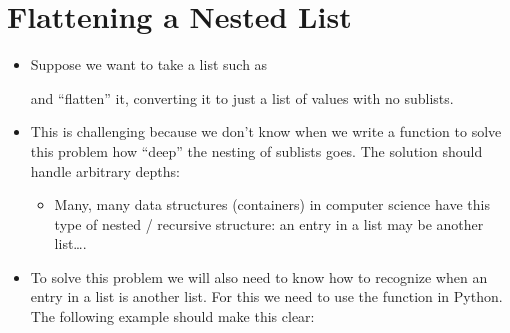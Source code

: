 \documentclass[letterpaper,10pt,english]{sphinxmanual}
\begin{document}
\section{Flattening a Nested List}
\label{\detokenize{lecture_notes/lec23_recursion:flattening-a-nested-list}}\begin{itemize}
\item {} 
Suppose we want to take a list such as

%
\begin{sphinxVerbatim}[commandchars=\\\{\}]
  \PYG{p}{[}\PYG{p}{[}\PYG{p}{]}  \PYG{p}{[}\PYG{p}{[}\PYG{p}{]}\PYG{p}{]} \PYG{p}{[} \PYG{p}{[}  \PYG{p}{[}\PYG{p}{]} \PYG{p}{[}\PYG{p}{]} \PYG{p}{]}\PYG{p}{]}\PYG{p}{]}
\end{sphinxVerbatim}

and “flatten” it, converting it to just a list of values with no sublists.

%
\begin{sphinxVerbatim}[commandchars=\\\{\}]
  \PYG{p}{[}            \PYG{p}{]}
\end{sphinxVerbatim}

\item {} 
This is challenging because we don’t know when we write a function
to solve this problem how “deep” the nesting of
sublists goes.  The solution should handle arbitrary depths:
\begin{itemize}
\item {} 
Many, many data structures (containers) in computer
science have this type of nested / recursive structure:  an entry
in a list may be another list….

\end{itemize}

\item {} 
To solve this problem we will also need to know how to recognize
when an entry in a list is another list.  For this we need to use
the  function in Python.  The following example should make
this clear:


\end{itemize}
\end{document}
